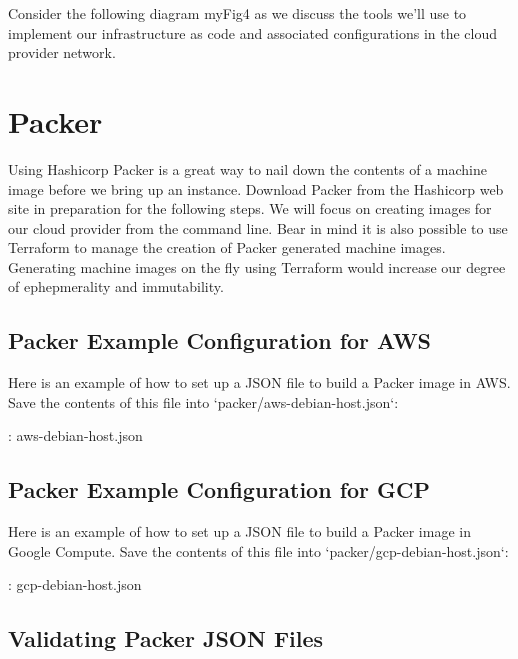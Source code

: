 Consider the following diagram {myFig4} as we discuss the tools we'll
use to implement our infrastructure as code and associated
configurations in the cloud provider network.

\section{Packer}

\justify
Using Hashicorp Packer is a great way to nail down the contents of a
machine image before we bring up an instance. Download Packer from the
Hashicorp web site in preparation for the following steps. 
We will focus on creating images for our cloud provider from the
command line. Bear in mind it is also possible to use Terraform to
manage the creation of Packer generated machine images. Generating
machine images on the fly using Terraform would increase our degree of
ephepmerality and immutability.

\subsection{Packer Example Configuration for AWS}

Here is an example of how to set up a JSON file to build a Packer image
in AWS. Save the contents of this file into
`packer/aws-debian-host.json`:

\justify
\begin{mybox}{\thetcbcounter: aws-debian-host.json}
	
\end{mybox}

\subsection{Packer Example Configuration for GCP}

\justify
Here is an example of how to set up a JSON file to build a Packer image
in Google Compute. Save the contents of this file into
`packer/gcp-debian-host.json`:

\justify
\begin{mybox}{\thetcbcounter: gcp-debian-host.json}
	
\end{mybox}


\subsection{Validating Packer JSON Files}

